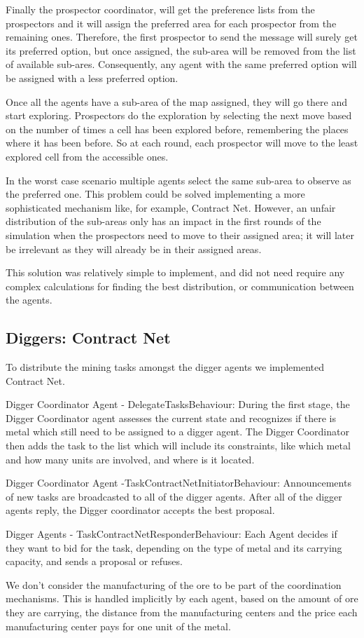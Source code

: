 Finally the prospector coordinator, will get the preference lists from the prospectors and it will assign the preferred area for each prospector from the remaining ones. Therefore, the first prospector to send the message will surely get its preferred option, but once assigned, the sub-area will be removed from the list of available sub-ares. Consequently, any agent with the same preferred option will be assigned with a less preferred option.

Once all the agents have a sub-area of the map assigned, they will go there and start exploring. Prospectors do the exploration by selecting the next move based on the number of times a cell has been explored before, remembering the places where it has been before. So at each round, each prospector will move to the least explored cell from the accessible ones. 

In the worst case scenario multiple agents select the same sub-area to observe as the preferred one. This problem could be solved implementing a more sophisticated mechanism like, for example, Contract Net. However, an unfair distribution of the sub-areas only has an impact in the first rounds of the simulation when the prospectors need to move to their assigned area; it will later be irrelevant as they will already be in their assigned areas. 

This solution was relatively simple to implement, and did not need require any complex calculations for finding the best distribution, or communication between the agents.




\subsection{Diggers: Contract Net}

To distribute the mining tasks amongst the digger agents we implemented Contract Net.

Digger Coordinator Agent - DelegateTasksBehaviour:
During the first stage, the Digger Coordinator agent assesses the current state and recognizes if there is metal which still need to be assigned to a digger agent. The Digger Coordinator then adds the task to the list which will include its constraints, like which metal and how many units are involved, and where is it located. 

Digger Coordinator Agent -TaskContractNetInitiatorBehaviour:
Announcements of new tasks are broadcasted to all of the digger agents. After all of the digger agents reply, the Digger coordinator accepts the best proposal. 

Digger Agents - TaskContractNetResponderBehaviour:
Each Agent decides if they want to bid for the task, depending on the type of metal and its carrying capacity, and sends a proposal or refuses.

We don’t consider the manufacturing of the ore to be part of the coordination mechanisms. This is handled implicitly by each agent, based on the amount of ore they are carrying, the distance from the manufacturing centers and the price each manufacturing center pays for one unit of the metal.


